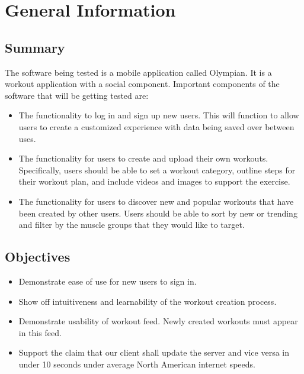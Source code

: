 \documentclass[12pt, titlepage]{article}
\begin{document}
	\section{General Information}
	
	\subsection{Summary}
	
	
	The software being tested is a mobile application called Olympian. It is a workout application with a social component.
	Important components of the software that will be getting tested are:

	\begin{itemize}
		\item The functionality to log in and sign up new users. This will function to allow users to create a customized experience with data being saved over between uses.
		\item The functionality for users to create and upload their own workouts. Specifically, users should be able to set a workout category, outline steps for their workout plan, and include videos and images to support the exercise.
		\item The functionality for users to discover new and popular workouts that have been created by other users. Users should be able to sort by new or trending and filter by the muscle groups that they would like to target.
	\end{itemize}
	
	\subsection{Objectives}
	

		\begin{itemize}
			\item Demonstrate ease of use for new users to sign in.
			\item Show off intuitiveness and learnability of the workout creation process.
			\item Demonstrate usability of workout feed. Newly created workouts must appear in this feed.
			\item Support the claim that our client shall update the server and vice versa in under 10 seconds under average North American internet speeds.
		\end{itemize}
\end{document}
